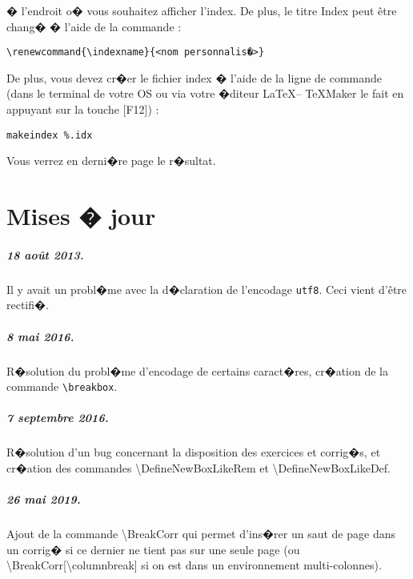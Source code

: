 \documentclass[ams,openany,10pt,presentation,latin1]{mathbook}
\begin{document}
\medskip

� l'endroit o� vous souhaitez afficher l'index. De plus, le titre \og Index \fg{} peut \^etre chang� � l'aide de la commande :

\medskip

\begin{lstlisting}
\renewcommand{\indexname}{<nom personnalis�>}
\end{lstlisting}

\medskip

De plus, vous devez cr�er le fichier \og index \fg{} � l'aide de la ligne de commande (dans le terminal de votre OS ou via votre �diteur \LaTeX -- TeXMaker le fait en appuyant sur la touche [F12]) :

\medskip

\begin{lstlisting}
makeindex %.idx
\end{lstlisting}

\medskip

Vous verrez en derni�re page le r�sultat.

\chapter{Mises � jour}

\paragraph*{18 ao\^ut 2013.} Il y avait un probl�me avec la d�claration de l'encodage \texttt{utf8}. Ceci vient d'\^etre rectifi�.

\medskip

\paragraph*{8 mai 2016.} R�solution du probl�me d'encodage de certains caract�res, cr�ation de la commande \texttt{\textbackslash breakbox}.

\medskip

\paragraph*{7 septembre 2016.} R�solution d'un bug concernant la disposition des exercices et corrig�s, et cr�ation des commandes \textbackslash DefineNewBoxLikeRem et \textbackslash DefineNewBoxLikeDef.

\medskip

\paragraph*{26 mai 2019.} Ajout de la commande \textbackslash BreakCorr qui permet d'ins�rer un saut de page dans un corrig� si ce dernier ne tient pas sur une seule page (ou \textbackslash BreakCorr[\textbackslash columnbreak] si on est dans un environnement multi-colonnes).


\backmatter

\def\nbcolindex{1}
\printindex
\end{document}
